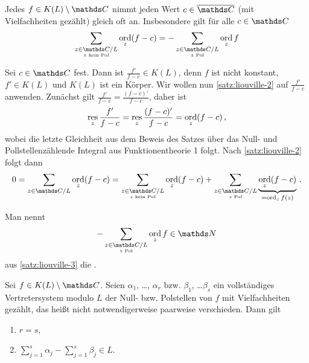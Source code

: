 \begin{satz}\label{satz:liouville-3}
Jedes $f \in K(L)\setminus\CC$ nimmt jeden Wert $c\in\closure\CC$ (mit Vielfachheiten gezählt) gleich oft an.
Insbesondere gilt für alle $c\in\CC$
\[
	\sum_{\substack{z\in\CC/L\\ \scriptscriptstyle z \text{ kein Pol}}} \ord_z(f-c)
	= -\sum_{\substack{z\in\CC/L\\ \scriptscriptstyle z \text{ Pol}}} \ord_z f
\]
\end{satz}

\begin{bewe}
Sei $c\in\CC$ fest.
Dann ist $\frac{f'}{f-c} \in K(L)$, denn $f$ ist nicht konstant, $f'\in K(L)$ und $K(L)$ ist ein Körper.
Wir wollen nun \autoref{satz:liouville-2} auf $\frac{f'}{f-c}$ anwenden.
Zunächst gilt $\frac{f'}{f-c} = \frac{(f-c)'}{f-c}$, daher ist
\[
	\operatorname*{res}_z \frac{f'}{f-c}
	= \operatorname*{res}_z \frac{(f-c)'}{f-c}
	= \operatorname*{ord}_z (f-c)
	\,,
\]
wobei die letzte Gleichheit aus dem Beweis des Satzes über das Null- und Pollstellenzählende Integral aus Funktionentheorie 1 folgt.
Nach \autoref{satz:liouville-2} folgt dann
\[
	0
	= \sum_{z\in\CC/L} \ord_z (f-c)
	= \sum_{\substack{z\in\CC/L\\ \scriptscriptstyle z \text{ kein Pol}}} \ord_z (f-c)
	+ \sum_{\substack{z\in\CC/L\\ \scriptscriptstyle z \text{ Pol}}} \underbrace{\ord_z (f-c)}_{=\ord_z f(z)}
	\,.
\]
\end{bewe}

\begin{defi}
Man nennt
\[
	-\sum_{\substack{z\in\CC/L\\ \scriptscriptstyle z \text{ Pol}}} \ord_z f \in \NN
\]
aus \autoref{satz:liouville-3} die .
\end{defi}

\begin{satz}\label{satz:liouville-4}
Sei $f\in K(L)\setminus\CC$.
Seien $\alpha_1$, \ldots, $\alpha_r$ bzw. $\beta_1$, \ldots $\beta_s$ ein vollständiges Vertretersystem modulo $L$ der Null- bzw. Polstellen von $f$ mit Vielfachheiten gezählt, das heißt nicht notwendigerweise paarweise verschieden.
Dann gilt
\begin{enumerate}
\item $r = s$,
\item $\sum_{j=1}^s \alpha_j - \sum_{j=1}^s \beta_j \in L$.
\end{enumerate}
\end{satz}

